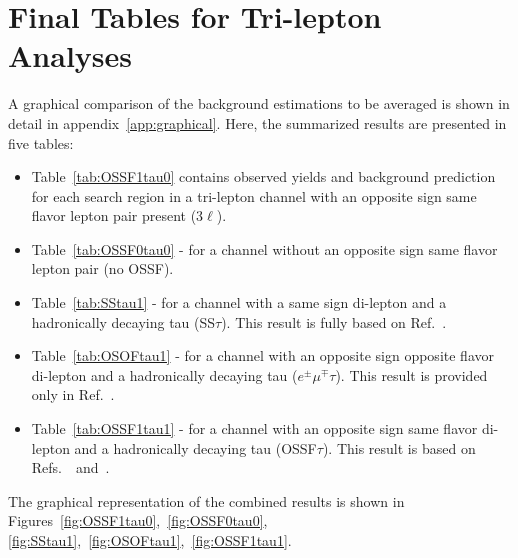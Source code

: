 \section{Final Tables for Tri-lepton Analyses}
A graphical comparison of the background estimations to be averaged is shown in detail in appendix~\ref{app:graphical}. 
Here, the summarized results are presented in five tables: 
\begin{itemize}
\item Table~\ref{tab:OSSF1tau0} contains observed yields  and background prediction 
for each search region in a tri-lepton channel with an opposite sign same flavor lepton pair present (3$\ell$).
\item Table~\ref{tab:OSSF0tau0}  - for a channel without  an opposite sign same flavor lepton pair (no OSSF).
\item Table~\ref{tab:SStau1} - for a channel with a same sign di-lepton and a hadronically decaying tau (SS$\tau$). 
This result is fully based on Ref.~\cite{AN2012:248}.
\item Table~\ref{tab:OSOFtau1} - for a channel with an opposite sign opposite flavor di-lepton and 
a hadronically decaying tau ($e^\pm\mu^\mp\tau$). This result is provided only in Ref.~\cite{AN2012:255}.
\item Table~\ref{tab:OSSF1tau1} - for a channel with an opposite sign same flavor di-lepton and 
a hadronically decaying tau (OSSF$\tau$). This result is based on Refs.~\cite{AN2012:255}~and~\cite{AN2012:256}.
\end{itemize}

The graphical representation of the combined results is shown in Figures~\ref{fig:OSSF1tau0},~\ref{fig:OSSF0tau0},
\ref{fig:SStau1},~\ref{fig:OSOFtau1},~\ref{fig:OSSF1tau1}.

